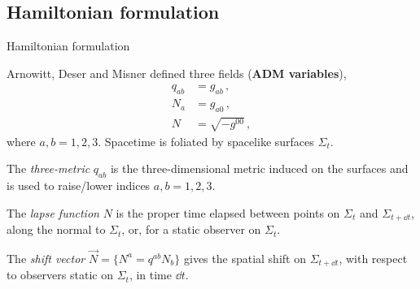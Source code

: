 \documentclass[12pt,titlepage]{article}
\begin{document}
\subsection{Hamiltonian formulation}

\begin{frame}{Hamiltonian formulation}
    \begin{list}{\,}{\leftmargin=1em \itemindent=0em}
        \item<1-> Arnowitt, Deser and Misner defined three fields (\textbf{ADM variables}),
        \begin{align}
            q_{ab}&=g_{ab}\,,\\
            N_a&=g_{a0}\,,\\
            N&=\sqrt{-g^{00}}\,,
        \end{align}
        where $a,b=1,2,3$. Spacetime is foliated by spacelike surfaces $\Sigma_t$. 
        \item<2-> The \textit{three-metric} $q_{ab}$ is the three-dimensional metric induced on the surfaces and is used to raise/lower indices $a,b=1,2,3$.
        \item<3-> The \textit{lapse function} $N$ is the proper time elapsed between points on $\Sigma_t$ and $\Sigma_{t+\dd{t}}$, along the normal to $\Sigma_t$, or, for a static observer on $\Sigma_t$.
        \item<4-> The \textit{shift vector} $\vec{N}=\{N^a=q^{ab}N_b\}$ gives the spatial shift on $\Sigma_{t+\dd{t}}$, with respect to observers static on $\Sigma_t$, in time $\dd{t}$.
    \end{list}
\end{frame}
\end{document}
